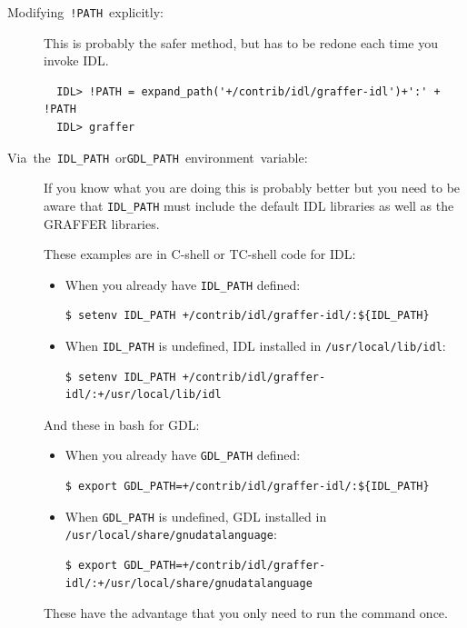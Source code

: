 \documentclass[11pt,twoside,english]{article}
\begin{document}
\begin{description}
\item [Modifying~\texttt{!PATH}~explicitly:]This is probably the safer
  method, but has to be redone each time you invoke IDL.
\begin{verbatim}
  IDL> !PATH = expand_path('+/contrib/idl/graffer-idl')+':' + !PATH
  IDL> graffer
\end{verbatim}

\item [Via~the~\texttt{IDL\_PATH}~or\texttt{GDL\_PATH}~environment~variable:]If you know
  what you are doing this is probably better but you need to be aware
  that \texttt{IDL\_PATH} must include the default IDL libraries as
  well as the GRAFFER libraries.


  These examples are in C-shell or TC-shell code for IDL:

  \begin{itemize}
  \item When you already have \texttt{IDL\_PATH} defined:
\begin{verbatim}
$ setenv IDL_PATH +/contrib/idl/graffer-idl/:${IDL_PATH}
\end{verbatim}
  \item When \texttt{IDL\_PATH} is undefined, IDL installed in
    \texttt{/usr/local/lib/idl}: 
\begin{verbatim}
$ setenv IDL_PATH +/contrib/idl/graffer-idl/:+/usr/local/lib/idl
\end{verbatim}
  \end{itemize}

  And these in bash for GDL:
  \begin{itemize}
  \item When you already have \texttt{GDL\_PATH} defined:
\begin{verbatim}
$ export GDL_PATH=+/contrib/idl/graffer-idl/:${IDL_PATH}
\end{verbatim}
  \item When \texttt{GDL\_PATH} is undefined, GDL installed in
    \texttt{/usr/local/share/gnudatalanguage}:
\begin{verbatim}
$ export GDL_PATH=+/contrib/idl/graffer-idl/:+/usr/local/share/gnudatalanguage
\end{verbatim}
  \end{itemize}
  These have the advantage that you only need to run the command once.

\end{description}
\end{document}
